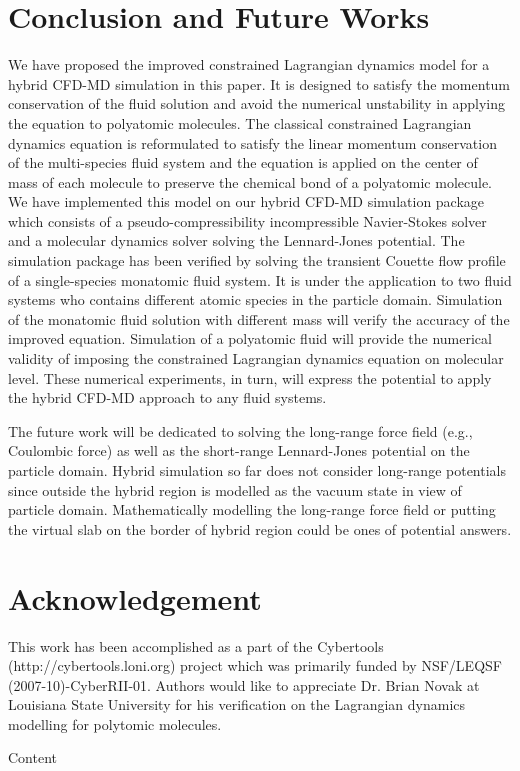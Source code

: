 \documentclass[]{aiaa-tc}%
\begin{document}


\section{Conclusion and Future Works}
\label{sec:conclusion}

We have proposed the improved constrained Lagrangian dynamics model for 
a hybrid CFD-MD simulation in this paper. It is designed to satisfy 
the momentum conservation of the fluid solution and avoid the numerical
unstability in applying the equation to polyatomic molecules. The 
classical constrained Lagrangian dynamics equation is reformulated
to satisfy the linear momentum conservation of the multi-species fluid
system and the equation is applied on the center of mass of each 
molecule to preserve the chemical bond of a polyatomic molecule.
We have implemented this model on our hybrid CFD-MD simulation package
which consists of a pseudo-compressibility incompressible Navier-Stokes
solver and a molecular dynamics solver solving the Lennard-Jones
potential. The simulation package has been verified by solving the 
transient Couette flow profile of a single-species monatomic fluid 
system.
It is under the application to two fluid systems who contains different
atomic species in the particle domain. Simulation of the monatomic 
fluid solution with different mass will verify the accuracy of
the improved equation. Simulation of a polyatomic fluid will provide 
the numerical validity of imposing the constrained Lagrangian dynamics
equation on molecular level. These numerical experiments, in turn, will
express the potential to apply the hybrid CFD-MD approach to any fluid
systems.

The future work will be dedicated to solving the long-range force
field (e.g., Coulombic force) as well as the short-range Lennard-Jones
potential on the particle domain. Hybrid simulation so far does not
consider long-range potentials since outside the hybrid region is
modelled as the vacuum state in view of particle domain. Mathematically
modelling the long-range force field or putting the virtual slab 
on the border of hybrid region could be ones of potential answers.



\section*{Acknowledgement}

This work has been accomplished as a part of the Cybertools
(http://cybertools.loni.org) project which was primarily funded by 
NSF/LEQSF (2007-10)-CyberRII-01. Authors would like to appreciate
Dr. Brian Novak at Louisiana State University for his verification on
the Lagrangian dynamics modelling for polytomic molecules.

Content





\end{document}
